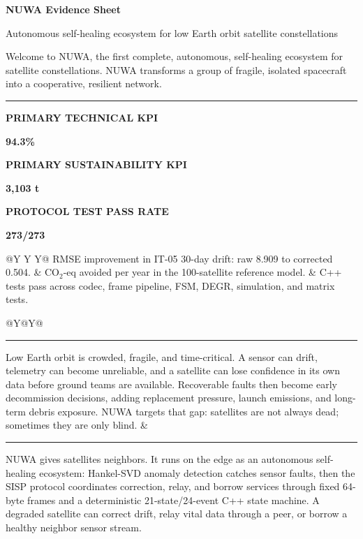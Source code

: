 \documentclass{article}
\newcommand{\labeltext}[1]{{\scriptsize\bfseries\color{muted}\MakeUppercase{#1}}}
\newcommand{\sectionhead}[1]{\vspace{1.4pt}{\color{navy}\bfseries\MakeUppercase{#1}}\par{\color{blue}\rule{\linewidth}{0.4pt}}\vspace{0.3pt}}
\newcommand{\metricline}[3]{%
  \begin{minipage}[t]{0.315\linewidth}
    \labeltext{#1}\par
    {\color{#2}\fontsize{16}{17}\selectfont\bfseries #3}
  \end{minipage}
}
\begin{document}
\enlargethispage{2\baselineskip}
\fontsize{7.85}{8.85}\selectfont

\begin{minipage}[t]{\linewidth}
{\color{navy}\fontsize{22}{23}\selectfont\bfseries NUWA Evidence Sheet}\par
{\color{ink}\normalsize Autonomous self-healing ecosystem for low Earth orbit satellite constellations}\par
{\color{muted}\small Welcome to NUWA, the first complete, autonomous, self-healing ecosystem for satellite constellations. NUWA transforms a group of fragile, isolated spacecraft into a cooperative, resilient network.}
\end{minipage}

\vspace{4pt}
{\color{blue}\rule{\linewidth}{0.7pt}}
\vspace{1pt}

\metricline{Primary technical KPI}{blue}{94.3\%}
\hfill
\metricline{Primary sustainability KPI}{green}{3,103 t}
\hfill
\metricline{Protocol test pass rate}{blue}{273/273}

\vspace{-1pt}
\begin{tabularx}{\linewidth}{@{}Y Y Y@{}}
{\scriptsize RMSE improvement in IT-05 30-day drift: raw 8.909 to corrected 0.504.} &
{\scriptsize CO$_2$-eq avoided per year in the 100-satellite reference model.} &
{\scriptsize C++ tests pass across codec, frame pipeline, FSM, DEGR, simulation, and matrix tests.}
\end{tabularx}

\vspace{-1pt}
\begin{tabularx}{\linewidth}{@{}Y@{\hspace{10pt}}Y@{}}
\sectionhead{Problem Statement}
Low Earth orbit is crowded, fragile, and time-critical. A sensor can drift, telemetry can become unreliable, and a satellite can lose confidence in its own data before ground teams are available. Recoverable faults then become early decommission decisions, adding replacement pressure, launch emissions, and long-term debris exposure. NUWA targets that gap: satellites are not always dead; sometimes they are only blind.
&
\sectionhead{Core Function}
NUWA gives satellites neighbors. It runs on the edge as an autonomous self-healing ecosystem: Hankel-SVD anomaly detection catches sensor faults, then the SISP protocol coordinates correction, relay, and borrow services through fixed 64-byte frames and a deterministic 21-state/24-event C++ state machine. A degraded satellite can correct drift, relay vital data through a peer, or borrow a healthy neighbor sensor stream.
\end{tabularx}
\end{document}
